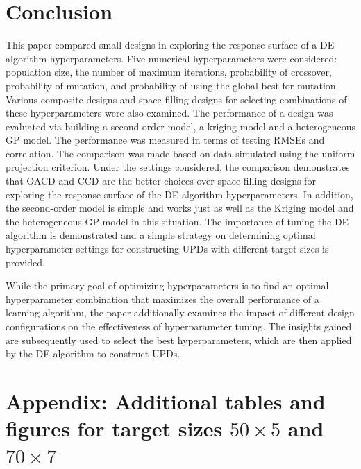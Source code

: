 \documentclass [PhD] {package/uclathes}
\begin{document}
\section{Conclusion}
This paper compared small designs in exploring the response surface of a DE algorithm hyperparameters. Five numerical hyperparameters were considered:  population size, the number of maximum iterations, probability of crossover, probability of mutation, and probability of using the global best for mutation. Various composite designs and space-filling designs for selecting combinations of these hyperparameters were also examined. The performance of a design was evaluated via building a second order model, a kriging model and a heterogeneous GP model. The performance was measured in terms of testing RMSEs and correlation. The comparison was made based on data simulated using the uniform projection criterion. Under the settings considered, the comparison demonstrates that OACD and CCD are the better choices over space-filling designs for exploring the response surface of the DE algorithm hyperparameters. In addition, the second-order model is simple and works just as well as the Kriging model and the heterogeneous GP model in this situation. The importance of tuning the DE algorithm is demonstrated and a simple strategy on determining optimal hyperparameter settings for  constructing UPDs with different target sizes is provided.

While the primary goal of optimizing hyperparameters is to find an optimal hyperparameter combination that maximizes the overall performance of a learning algorithm, the paper additionally examines the impact of different design configurations on the effectiveness of hyperparameter tuning. The insights gained are subsequently used to select the best hyperparameters, which are then applied by the DE algorithm to construct UPDs.

\clearpage
\section*{Appendix: Additional tables and figures for target sizes $50\times5$ and $70\times7$}
\end{document}
